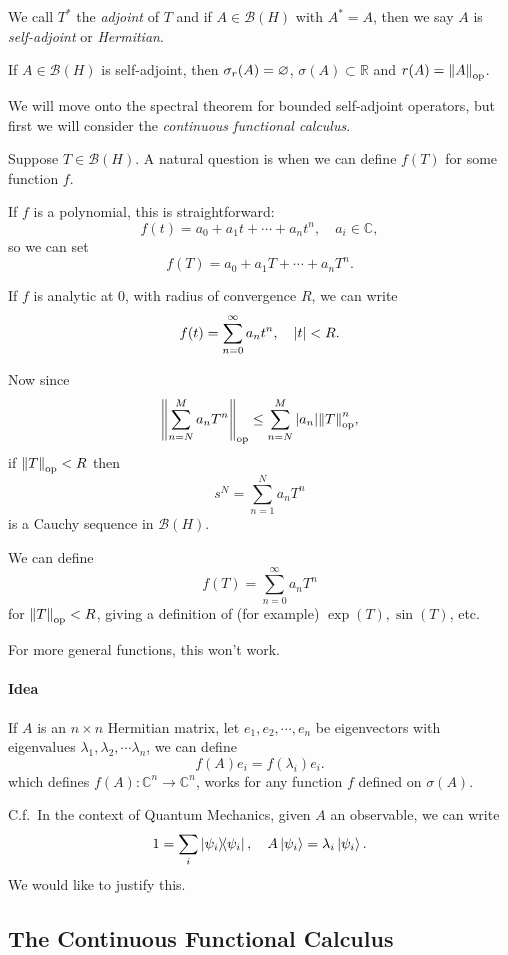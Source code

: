 \documentclass[a4paper,11pt]{article}
\begin{document}
	We call $T^*$ the \emph{adjoint} of $T$ and if $A \in \mathcal{B}(H)$ with $A^* = A$, then we say $A$ is \emph{self-adjoint} or \emph{Hermitian}.

	\begin{thm}
		If $A \in \mathcal{B}(H)$ is self-adjoint, then $\sigma_r(A) = \varnothing$, $\sigma(A) \subset \mathbb{R}$ and $r(A) = \norm{A}_{\mathrm{op}}$. 
	\end{thm}

	We will move onto the spectral theorem for bounded self-adjoint operators, but first we will consider the \emph{continuous functional calculus}.

	Suppose $T \in \mathcal{B}(H)$. A natural question is when we can define $f(T)$ for some function $f$. 
	
	If $f$ is a polynomial, this is straightforward:
	\[
		f(t) = a_0 + a_1 t + \cdots + a_n t^n, \quad a_i \in \mathbb{C},
	\]
	so we can set 
	\[
		f(T) = a_0 + a_1 T + \cdots + a_n T^n.
	\]

	If $f$ is analytic at $0$, with radius of convergence $R$, we can write 
	\[
		f(t) = \sum _{ n = 0}^{\infty} a_n t^n, \quad \abs{t} < R.
	\]
	
	Now since 
	\[
		\norm{\sum _{n = N}^M a_n T^n}_{\mathrm{op}} \leq \sum _{n = N}^M \abs{a_n} \norm{T}_{\mathrm{op}}^n,
	\]
	if $\norm{T}_{\mathrm{op}} < R$ then 
	\[
		s^N = \sum _{n = 1}^N a_n T^n
	\]
	is a Cauchy sequence in $\mathcal{B}(H)$.

	We can define 
	\[
		f(T) = \sum _{n = 0}^{\infty} a_n T^n
	\]
	for $\norm{T}_{\mathrm{op}} < R$, giving a definition of (for example) $\exp(T), \sin(T)$, etc.
	
	For more general functions, this won't work.
	
	\paragraph{Idea} If $A$ is an $n\times n$ Hermitian matrix, let $e_1, e_2, \cdots, e_n$ be eigenvectors with eigenvalues $\lambda_1, \lambda_2, \cdots \lambda_n$, we can define 
	\[
		f(A) e_i = f(\lambda_i) e_i.
	\]
	which defines $f(A) : \mathbb{C}^n \to \mathbb{C}^n$, works for any function $f$ defined on $\sigma(A)$.

	C.f.\ In the context of Quantum Mechanics, given $A$ an observable, we can write 
	\[
		1 = \sum_i \dyad{\psi_i}{\psi_i}, \quad A \ket{\psi_i} = \lambda_i \ket{\psi_i}.
	\]
	We would like to justify this.

	\subsection{The Continuous Functional Calculus}
\end{document}
